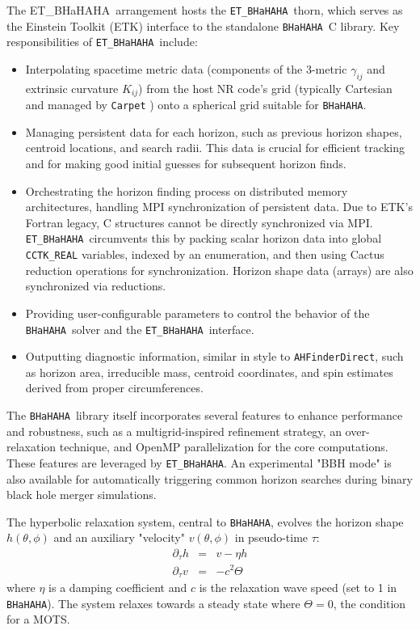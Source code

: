 \documentclass[a4paper,11pt]{article}
\newcommand{\thorn}[1]{{\tt #1}}
\newcommand{\arrangement}[1]{{\sc #1}}
\newcommand{\ETBHaHAHA}{\arrangement{ET\_BHaHAHA}}
\newcommand{\BHaHAHA}{\thorn{ET\_BHaHAHA}} %
\newcommand{\bhahlib}{\texttt{BHaHAHA}} %
\begin{document}
The \ETBHaHAHA\ arrangement hosts the \BHaHAHA\ thorn, which serves as the Einstein Toolkit (ETK) \cite{Loffler2011} interface to the standalone \bhahlib\ C library. Key responsibilities of \BHaHAHA\ include:
\begin{itemize}
    \item Interpolating spacetime metric data (components of the 3-metric $\gamma_{ij}$ and extrinsic curvature $K_{ij}$) from the host NR code's grid (typically Cartesian and managed by \thorn{Carpet} \cite{Schnetter04,CarpetWeb}) onto a spherical grid suitable for \bhahlib.
    \item Managing persistent data for each horizon, such as previous horizon shapes, centroid locations, and search radii. This data is crucial for efficient tracking and for making good initial guesses for subsequent horizon finds.
    \item Orchestrating the horizon finding process on distributed memory architectures, handling MPI synchronization of persistent data. Due to ETK's Fortran legacy, C structures cannot be directly synchronized via MPI. \BHaHAHA\ circumvents this by packing scalar horizon data into global \texttt{CCTK\_REAL} variables, indexed by an enumeration, and then using Cactus reduction operations for synchronization. Horizon shape data (arrays) are also synchronized via reductions.
    \item Providing user-configurable parameters to control the behavior of the \bhahlib\ solver and the \BHaHAHA\ interface.
    \item Outputting diagnostic information, similar in style to \thorn{AHFinderDirect}, such as horizon area, irreducible mass, centroid coordinates, and spin estimates derived from proper circumferences.
\end{itemize}
The \bhahlib\ library itself incorporates several features to enhance performance and robustness, such as a multigrid-inspired refinement strategy, an over-relaxation technique, and OpenMP parallelization for the core computations. These features are leveraged by \BHaHAHA. An experimental "BBH mode" is also available for automatically triggering common horizon searches during binary black hole merger simulations.

The hyperbolic relaxation system, central to \bhahlib, evolves the horizon shape $h(\theta, \phi)$ and an auxiliary "velocity" $v(\theta, \phi)$ in pseudo-time $\tau$:
\begin{eqnarray}
\partial_\tau h &=& v - \eta h \label{eq:hr_h_intro} \\
\partial_\tau v &=& -c^2 \Theta \label{eq:hr_v_intro}
\end{eqnarray}
where $\eta$ is a damping coefficient and $c$ is the relaxation wave speed (set to 1 in \bhahlib). The system relaxes towards a steady state where $\Theta = 0$, the condition for a MOTS.
\end{document}
